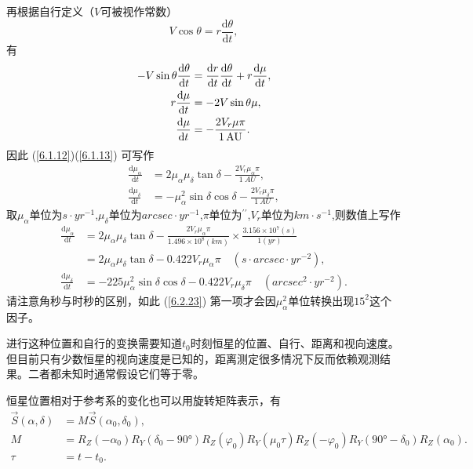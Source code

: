 \documentclass[11pt, a4paper, oneside]{ctexart}
\numberwithin{equation}{subsection}
\begin{document}
再根据自行定义（$V$可被视作常数）
\begin{equation}
V\cos\theta=r\frac{\mathrm{d}\theta}{\mathrm{d}t},
\end{equation}
有
\begin{align}
-V\sin\theta\frac{\mathrm{d}\theta}{\mathrm{d}t}&=\frac{\mathrm{d}r}{\mathrm{d}t}\frac{\mathrm{d}\theta}{\mathrm{d}t}+r\frac{\mathrm{d}\mu}{\mathrm{d}t},\notag\\
r\frac{\mathrm{d}\mu}{\mathrm{d}t}&=-2V\sin\theta\mu,\notag\\
\frac{\mathrm{d}\mu}{\mathrm{d}t}&=-\frac{2V_r\mu\pi}{\qty{1}{AU}}.
\end{align}
因此 (\ref{6.1.12})(\ref{6.1.13}) 可写作
\begin{align}
\frac{\mathrm{d}\mu_\alpha}{\mathrm{d}t}&=2\mu_\alpha\mu_\delta\tan\delta-\frac{2V_r\mu_\alpha\pi}{\qty{1}{AU}},\\
\frac{\mathrm{d}\mu_\delta}{\mathrm{d}t}&=-\mu_\alpha^2\sin\delta\cos\delta-\frac{2V_r\mu_\delta\pi}{\qty{1}{AU}},
\end{align}
取$\mu_\alpha$单位为$\unit{s\cdot yr^{-1}}$,$\mu_\delta$单位为$\unit{arcsec\cdot yr^{-1}}$,$\pi$单位为$^{\prime\prime}$,$V_r$单位为$\unit{km\cdot{}s^{-1}}$,则数值上写作
\begin{align}
\frac{\mathrm{d}\mu_\alpha}{\mathrm{d}t}&=2\mu_\alpha\mu_\delta\tan\delta-\frac{2V_r\mu_\alpha\pi}{1.496\times10^8\left(\unit{km}\right)}\times\frac{3.156\times10^7\left(\unit{s}\right)}{1\left(\unit{yr}\right)}\\
&=2\mu_\alpha\mu_\delta\tan\delta-0.422V_{r}\mu_\alpha\pi\quad\left(\unit{s\cdot arcsec\cdot yr^{-2}}\right),\\
\frac{\mathrm{d}\mu_\delta}{\mathrm{d}t}&=-225\mu_\alpha^2\sin\delta\cos\delta-0.422V_r\mu_\delta\pi\quad\left(\unit{arcsec^{2}\cdot yr^{-2}}\right).\label{6.2.23}
\end{align}
请注意角秒与时秒的区别，如此 (\ref{6.2.23}) 第一项才会因$\mu_{\alpha}^{2}$单位转换出现$15^{2}$这个因子。

进行这种位置和自行的变换需要知道$t_0$时刻恒星的位置、自行、距离和视向速度。但目前只有少数恒星的视向速度是已知的，距离测定很多情况下反而依赖观测结果。二者都未知时通常假设它们等于零。

恒星位置相对于参考系的变化也可以用旋转矩阵表示，有
\begin{align}
\vec S\left(\alpha,\delta\right)&=M\vec S\left(\alpha_0,\delta_0\right),\\
M&=R_Z\left(-\alpha_0\right)R_Y\left(\delta_0-\ang{90;;}\right)R_Z\left(\varphi_0\right)R_Y\left(\mu_0\tau\right)R_Z\left(-\varphi_0\right)R_Y\left(\ang{90;;}-\delta_0\right)R_Z\left(\alpha_0\right).\\
\tau&=t-t_{0}.
\end{align}
\end{document}
